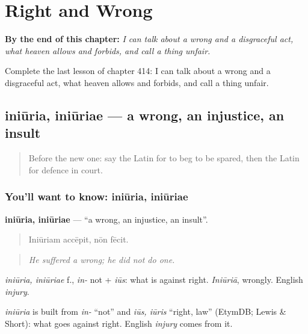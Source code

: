 
\chapter{Right and Wrong}
\label{ch:la-right-and-wrong}

\begin{chapteropening}
\textbf{By the end of this chapter:} \emph{I can talk about a wrong and a disgraceful act, what heaven allows and forbids, and call a thing unfair.}

Complete the last lesson of chapter 414: I can talk about a wrong and a disgraceful act, what heaven allows and forbids, and call a thing unfair.
\end{chapteropening}

\section[iniūria, iniūriae]{iniūria, iniūriae — a wrong, an injustice, an insult}

\label{lesson:LA-C414-iniuria}



\begin{quote}
Before the new one: say the Latin for to beg to be spared, then the Latin for defence in court.
\end{quote}

\subsection*{You'll want to know: iniūria, iniūriae}
\textbf{iniūria, iniūriae} — \textquotedblleft{}a wrong, an injustice, an insult\textquotedblright{}.

\begin{quote}
Iniūriam accēpit, nōn fēcit.
\end{quote}

\begin{quote}
\emph{He suffered a wrong; he did not do one.}
\end{quote}

\emph{iniūria, iniūriae} f., \emph{in-} not + \emph{iūs}: what is against right. \emph{Iniūriā}, wrongly. English \emph{injury}.

\begin{cousinweb}
\emph{iniūria} is built from \emph{in-} \textquotedblleft{}not\textquotedblright{} and \emph{iūs, iūris} \textquotedblleft{}right, law\textquotedblright{} (EtymDB; Lewis \& Short): what goes against right. English \emph{injury} comes from it.
\end{cousinweb}


